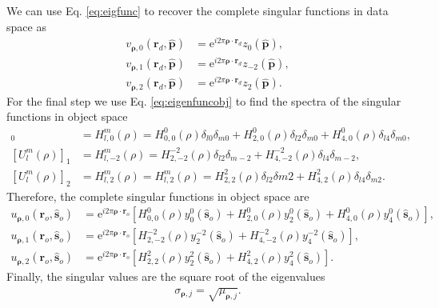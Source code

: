 \documentclass[11pt]{article}
\newcommand{\me}{\mathrm{e}}
\providecommand{\ro}[1]{\mathbf{\mathbf{r}}_o}
\providecommand{\so}[1]{\mathbf{\hat{s}}_o}
\providecommand{\rd}[1]{\mathbf{r}_d}
\providecommand{\mh}[1]{\mathbf{\hat{#1}}}
\providecommand{\bs}[1]{\boldsymbol{#1}}
\begin{document}
We can use Eq. \ref{eq:eigfunc} to recover the complete singular functions in
data space as
\begin{align}
  v_{\bs{\rho},0}(\rd{}, \mh{p}) &= \me{}^{i2\pi\bs{\rho}\cdot\rd{}}z_0(\mh{p}),\\
  v_{\bs{\rho},1}(\rd{}, \mh{p}) &= \me{}^{i2\pi\bs{\rho}\cdot\rd{}}z_{-2}(\mh{p}),\\
  v_{\bs{\rho},2}(\rd{}, \mh{p}) &= \me{}^{i2\pi\bs{\rho}\cdot\rd{}}z_2(\mh{p}).
\end{align}
For the final step we use Eq. \ref{eq:eigenfuncobj} to find the spectra of the
singular functions in object space
\begin{align}
  [U_l^m(\rho)]_0 &= H_{l,0}^m(\rho) = H_{0,0}^0(\rho)\delta_{l0}\delta_{m0} + H_{2,0}^0(\rho)\delta_{l2}\delta_{m0} + H_{4,0}^0(\rho)\delta_{l4}\delta_{m0},\\
  [U_l^m(\rho)]_1 &= H_{l,-2}^m(\rho) = H_{2,-2}^{-2}(\rho)\delta_{l2}\delta_{m-2} + H_{4,-2}^{-2}(\rho)\delta_{l4}\delta_{m-2},\\
  [U_l^m(\rho)]_2 &= H_{l,2}^m(\rho) = H_{l,2}^m(\rho) = H_{2,2}^{2}(\rho)\delta_{l2}\delta{m2} + H_{4,2}^{2}(\rho)\delta_{l4}\delta_{m2}.
\end{align}
Therefore, the complete singular functions in object space are
\begin{align}
  u_{\bs{\rho},0}(\ro{}, \so{}) &= \me{}^{i2\pi\bs{\rho}\cdot\ro{}}[H_{0,0}^0(\rho)y_0^0(\so{}) + H_{2,0}^0(\rho)y_2^0(\so{}) + H_{4,0}^0(\rho)y_4^0(\so{})],\\
  u_{\bs{\rho},1}(\ro{}, \so{}) &= \me{}^{i2\pi\bs{\rho}\cdot\ro{} }[H_{2,-2}^{-2}(\rho)y_2^{-2}(\so{}) + H_{4,-2}^{-2}(\rho)y_4^{-2}(\so{})],\\
  u_{\bs{\rho},2}(\ro{}, \so{}) &= \me{}^{i2\pi\bs{\rho}\cdot\ro{} }[H_{2,2}^2(\rho)y_2^2(\so{}) + H_{4,2}^2(\rho)y_4^2(\so{})].
\end{align}
Finally, the singular values are the square root of the eigenvalues
\begin{align}
  \sigma_{\bs{\rho},j} = \sqrt{\mu_{\bs{\rho},j}}. 
\end{align}
\end{document}
